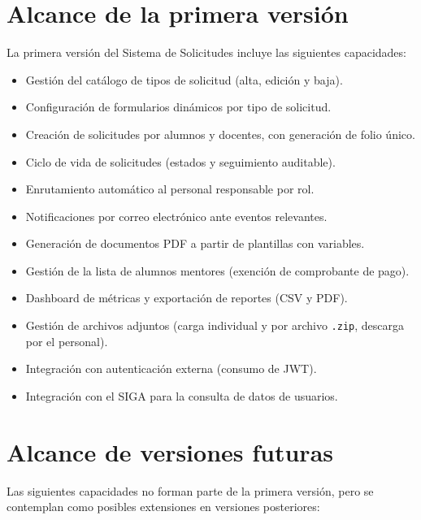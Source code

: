\documentclass[12pt,letterpaper]{report}
\begin{document}
\section{Alcance de la primera versión}

La primera versión del Sistema de Solicitudes incluye las siguientes capacidades:

\begin{itemize}
    \item Gestión del catálogo de tipos de solicitud (alta, edición y baja).
    \item Configuración de formularios dinámicos por tipo de solicitud.
    \item Creación de solicitudes por alumnos y docentes, con generación de folio único.
    \item Ciclo de vida de solicitudes (estados y seguimiento auditable).
    \item Enrutamiento automático al personal responsable por rol.
    \item Notificaciones por correo electrónico ante eventos relevantes.
    \item Generación de documentos PDF a partir de plantillas con variables.
    \item Gestión de la lista de alumnos mentores (exención de comprobante de pago).
    \item Dashboard de métricas y exportación de reportes (CSV y PDF).
    \item Gestión de archivos adjuntos (carga individual y por archivo \texttt{.zip}, descarga por el personal).
    \item Integración con autenticación externa (consumo de JWT).
    \item Integración con el SIGA para la consulta de datos de usuarios.
\end{itemize}

\section{Alcance de versiones futuras}

Las siguientes capacidades no forman parte de la primera versión, pero se contemplan como posibles extensiones en versiones posteriores:
\end{document}

